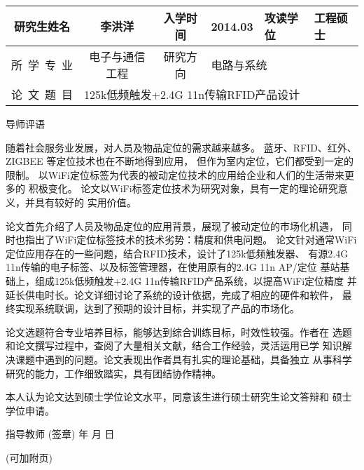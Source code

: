 \documentclass[a4paper,12pt]{article}
\newcommand*{\kaishu}{\CJKfamily{kaiti}}     %
\newcommand*{\heiti}{\CJKfamily{heiti}}     %
\begin{document}
\pagestyle{empty}
\fontsize{12}{16}\selectfont
\begin{center}
\begin{tabularx}{\textwidth}{c|c|c|c|c|X|X}
研究生姓名 & \multicolumn{2}{c|}{李洪洋} & 入学时间 & 2014.03 & 攻读学位
        & 工程硕士\\\hline
所~学~专~业 & \multicolumn{2}{c|}{电子与通信工程}
        & 研究方向 & \multicolumn{3}{l}{电路与系统}\\\hline
论~文~题~目 & \multicolumn{6}{l}{125k低频触发+2.4G 11n传输RFID产品设计}\\\hline
\end{tabularx}
\vskip 8mm
\Large \kaishu 导师评语\end{center}

\fontsize{12}{14}\selectfont

随着社会服务业发展，对人员及物品定位的需求越来越多。
蓝牙、RFID、红外、ZIGBEE 等定位技术也在不断地得到应用，
但作为室内定位，它们都受到一定的限制。
以WiFi定位标签为代表的被动定位技术的应用给企业和人们的生活带来更多的
积极变化。
论文以WiFi标签定位技术为研究对象，具有一定的理论研究意义，并具有较好的
实用价值。

论文首先介绍了人员及物品定位的应用背景，展现了被动定位的市场化机遇，
同时也指出了WiFi定位标签技术的技术劣势：精度和供电问题。
论文针对通常WiFi定位应用存在的一些问题，结合RFID技术，设计了125k低频触发器、
有源2.4G 11n传输的电子标签、以及标签管理器，在使用原有的2.4G 11n AP/定位
基站基础上，组成125k低频触发+2.4G 11n传输RFID产品系统，以提高WiFi定位精度
并延长供电时长。论文详细讨论了系统的设计依据，完成了相应的硬件和软件，
最终实现系统联调，达到了预期的设计目标，并实现了产品的市场化。

论文选题符合专业培养目标，能够达到综合训练目标，时效性较强。作者在
选题和论文撰写过程中，查阅了大量相关文献，结合工作经验，灵活运用已学
知识解决课题中遇到的问题。论文表现出作者具有扎实的理论基础，具备独立
从事科学研究的能力，工作细致踏实，具有团结协作精神。

本人认为论文达到硕士学位论文水平，同意该生进行硕士研究生论文答辩和
硕士学位申请。

\vfill
\hfill {\heiti 指导教师} \underline{\hskip 35mm} (签章)\qquad\qquad
\vskip 5mm
\hfill 年\hskip 12mm 月\hskip 12mm 日\qquad\qquad

\noindent(可加附页)
\end{document}

